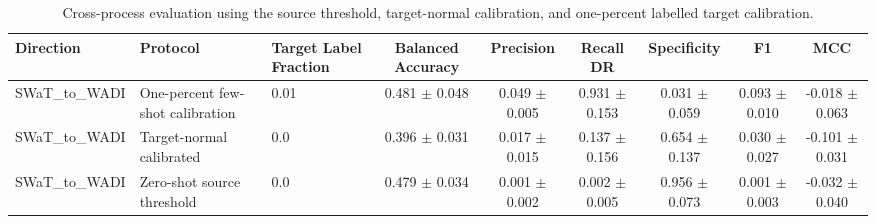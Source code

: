 \begin{table}[t]
\centering
\caption{Cross-process evaluation using the source threshold, target-normal calibration, and one-percent labelled target calibration.}
\label{tab:cross_process}
\renewcommand{\arraystretch}{1.12}
\setlength{\tabcolsep}{4pt}
\begin{tabular}{lllcccccc}
\hline
Direction & Protocol & Target Label Fraction & Balanced Accuracy & Precision & Recall DR & Specificity & F1 & MCC \\
\hline
SWaT_to_WADI & One-percent few-shot calibration & 0.01 & 0.481 $\pm$ 0.048 & 0.049 $\pm$ 0.005 & 0.931 $\pm$ 0.153 & 0.031 $\pm$ 0.059 & 0.093 $\pm$ 0.010 & -0.018 $\pm$ 0.063 \\
SWaT_to_WADI & Target-normal calibrated & 0.0 & 0.396 $\pm$ 0.031 & 0.017 $\pm$ 0.015 & 0.137 $\pm$ 0.156 & 0.654 $\pm$ 0.137 & 0.030 $\pm$ 0.027 & -0.101 $\pm$ 0.031 \\
SWaT_to_WADI & Zero-shot source threshold & 0.0 & 0.479 $\pm$ 0.034 & 0.001 $\pm$ 0.002 & 0.002 $\pm$ 0.005 & 0.956 $\pm$ 0.073 & 0.001 $\pm$ 0.003 & -0.032 $\pm$ 0.040 \\
\hline
\end{tabular}
\end{table}